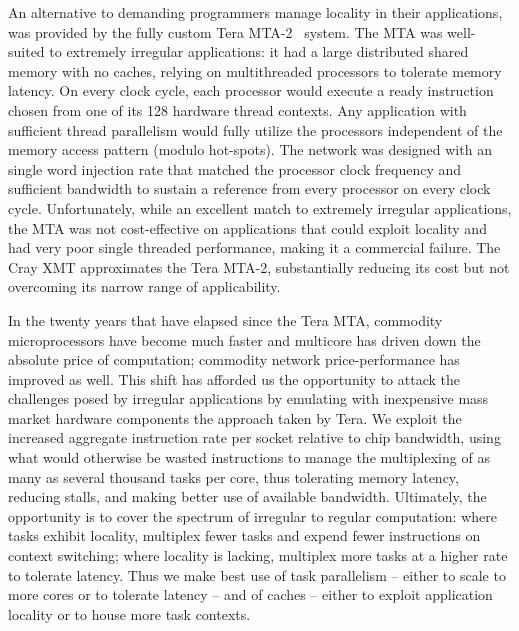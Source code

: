 An alternative to demanding programmers manage locality in their applications, was provided by the fully custom Tera MTA-2~\cite{mta-2} system.  The MTA was well-suited to extremely irregular applications: it had a large distributed shared memory with no caches, relying on multithreaded processors to tolerate memory latency.  On every clock cycle, each processor would execute a ready instruction chosen from one of its 128 hardware thread contexts.  Any application with sufficient thread parallelism would fully utilize the processors independent of the memory access pattern (modulo hot-spots).  The network was designed with an single word injection rate that matched the processor clock frequency and sufficient bandwidth to sustain a reference from every processor on every clock cycle.  Unfortunately, while an excellent match to extremely irregular applications, the MTA was not cost-effective on applications that could exploit locality and had very poor single threaded performance, making it a commercial failure.  The Cray XMT approximates the Tera MTA-2, substantially reducing its cost but not overcoming its narrow range of applicability.

In the twenty years that have elapsed since the Tera MTA, commodity microprocessors have become much faster and multicore has driven down the absolute price of computation; commodity network price-performance has improved as well.  This shift has afforded us the opportunity to attack the challenges posed by irregular applications by emulating with inexpensive mass market hardware components the approach taken by Tera. We exploit the increased aggregate instruction rate per socket relative to chip bandwidth, using what would otherwise be wasted instructions to manage the multiplexing of as many as several thousand tasks per core, thus tolerating memory latency, reducing stalls, and making better use of available bandwidth.  Ultimately, the opportunity is to cover the spectrum of irregular to regular computation:  where tasks exhibit locality, multiplex fewer tasks and expend fewer instructions on context switching; where locality is lacking, multiplex more tasks at a higher rate to tolerate latency.  Thus we make best use of task parallelism -- either to scale to more cores or to tolerate latency -- and of caches -- either to exploit application locality or to house more task contexts.

